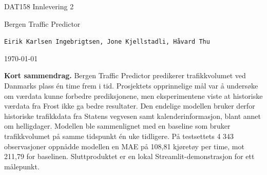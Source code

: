 \documentclass[11pt,a4paper]{article}
\newcommand{\groupmembers}{\texttt{Eirik Karlsen Ingebrigtsen, Jone Kjellstadli, Håvard Thu}}
\newcommand{\reportdate}{\today}
\begin{document}
\begin{flushright}
  DAT158 Innlevering 2
\end{flushright}
\vspace{0.5em}
{\fontsize{27}{32}\selectfont Bergen Traffic Predictor\par}
\vspace{0.45em}
{\large \groupmembers\par}
{\large \reportdate\par}
\vspace{1.5em}

{\small
\textbf{Kort sammendrag.} Bergen Traffic Predictor predikerer trafikkvolumet ved Danmarks plass én time frem i tid. Prosjektets opprinnelige mål var å undersøke om værdata kunne forbedre prediksjonene, men eksperimentene viste at historiske værdata fra Frost ikke ga bedre resultater. Den endelige modellen bruker derfor historiske trafikkdata fra Statens vegvesen samt kalenderinformasjon, blant annet om helligdager. Modellen ble sammenlignet med en baseline som bruker trafikkvolumet på samme tidspunkt én uke tidligere. På testsettets 4 343 observasjoner oppnådde modellen en MAE på 108,81 kjøretøy per time, mot 211,79 for baselinen. Sluttproduktet er en lokal Streamlit-demonstrasjon for ett målepunkt.
\par}






\end{document}
